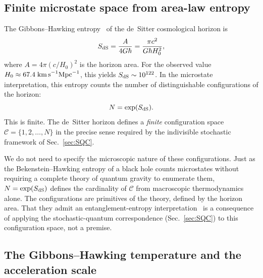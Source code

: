 \documentclass[aps,prd,twocolumn,superscriptaddress,nofootinbib]{revtex4-2}
\begin{document}
\subsection{Finite microstate space from area-law entropy}

The Gibbons--Hawking entropy~\cite{GibbonsHawking1977} of the de~Sitter cosmological horizon is
\begin{equation}
S_{\rm dS} = \frac{A}{4G\hbar} = \frac{\pi c^2}{G\hbar H_0^2},
\label{eq:GH_entropy}
\end{equation}
where $A = 4\pi (c/H_0)^2$ is the horizon area. For the observed value $H_0 \approx 67.4\;\text{km\,s}^{-1}\text{Mpc}^{-1}$, this yields $S_{\rm dS} \sim 10^{122}$. In the microstate interpretation, this entropy counts the number of distinguishable configurations of the horizon:
\begin{equation}
N = \exp(S_{\rm dS}).
\label{eq:N_configs}
\end{equation}
This is finite. The de~Sitter horizon defines a \emph{finite} configuration space $\mathcal{C} = \{1, 2, \ldots, N\}$ in the precise sense required by the indivisible stochastic framework of Sec.~\ref{sec:SQC}.

We do not need to specify the microscopic nature of these configurations. Just as the Bekenstein--Hawking entropy of a black hole counts microstates without requiring a complete theory of quantum gravity to enumerate them, $N = \exp(S_{\rm dS})$ defines the cardinality of $\mathcal{C}$ from macroscopic thermodynamics alone. The configurations are primitives of the theory, defined by the horizon area. That they admit an entanglement-entropy interpretation~\cite{RyuTakayanagi2006,VanRaamsdonk2010} is a consequence of applying the stochastic-quantum correspondence (Sec.~\ref{sec:SQC}) to this configuration space, not a premise.

\subsection{The Gibbons--Hawking temperature and the acceleration scale}
\end{document}
